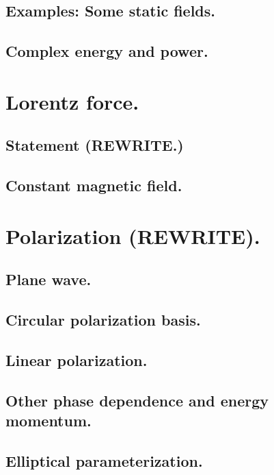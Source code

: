          \subsection{Examples: Some static fields.}
            
         \subsection{Complex energy and power.}
            
      \section{Lorentz force.}
         \subsection{Statement (REWRITE.)}
            
         \subsection{Constant magnetic field.}
            
      \section{Polarization (REWRITE).}
         \subsection{Plane wave.}
            
         \subsection{Circular polarization basis.}
            
         \subsection{Linear polarization.}
            
         \subsection{Other phase dependence and energy momentum.}
            
         \subsection{Elliptical parameterization.}
            
